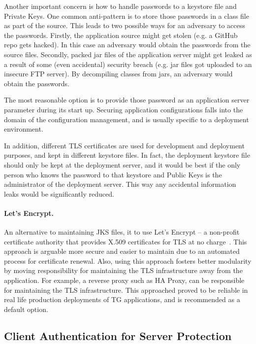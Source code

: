 \documentclass[a4paper,12pt,oneside,openright]{memoir}
\begin{document}
	Another important concern is how to handle passwords to a keystore file and Private Keys.
	One common anti-pattern is to store those passwords in a class file as part of the source.
	This leads to two possible ways for an adversary to access the passwords.
	Firstly, the application source might get stolen (e.g. a GitHub repo gets hacked).
	In this case an adversary would obtain the passwords from the source files.
	Secondly, packed jar files of the application server might get leaked as a result of some (even accidental) security breach (e.g. jar files got uploaded to an insecure FTP server).
	By decompiling classes from jars, an adversary would obtain the passwords.

	The most reasonable option is to provide those password as an application server parameter during its start up.
	Securing application configurations falls into the domain of the configuration management, and is usually specific to a deployment environment.

	In addition, different TLS certificates are used for development and deployment purposes, and kept in different keystore files.
	In fact, the deployment keystore file should only be kept at the deployment server, and it would be best if the only person who knows the password to that keystore and Public Keys is the administrator of the deployment server.
	This way any accidental information leaks would be significantly reduced.

	\paragraph{Let's Encrypt.}
	An alternative to maintaining JKS files, it to use Let's Encrypt -- a non-profit certificate authority that provides X.509 certificates for TLS at no charge~\cite{LEC}.
	This approach is arguable more secure and easier to maintain due to an automated process for certificate renewal.
	Also, using this approach fosters better modularity by moving responsibility for maintaining the TLS infrastructure away from the application.
	For example, a reverse proxy such as HA Proxy, can be responsible for maintaining the TLS infrastructure.
	This approached proved to be reliable in real life production deployments of TG applications, and is recommended as a default option.


\subsection*{Client Authentication for Server Protection}
\end{document}
